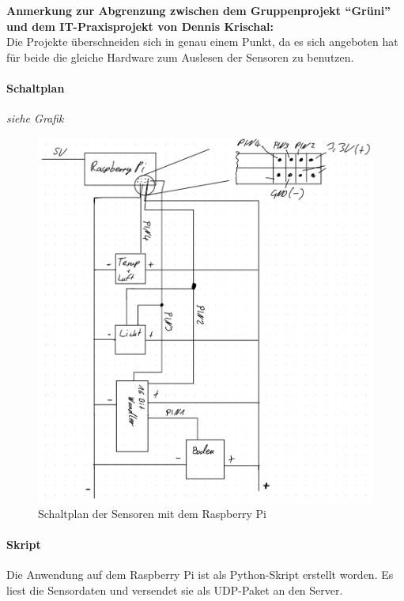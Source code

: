 \textbf{Anmerkung zur Abgrenzung zwischen dem Gruppenprojekt ``Grüni''
und dem IT-Praxisprojekt von Dennis Krischal:}\\
Die Projekte überschneiden sich in genau einem Punkt, da es sich
angeboten hat für beide die gleiche Hardware zum Auslesen der Sensoren
zu benutzen.

\hypertarget{schaltplan}{%
\paragraph{Schaltplan}\label{schaltplan}}

\emph{siehe Grafik}

\begin{figure}
\centering
\includegraphics{img/schaltplan.png}
\caption{Schaltplan der Sensoren mit dem Raspberry Pi}
\end{figure}

\hypertarget{skript}{%
\paragraph{Skript}\label{skript}}

Die Anwendung auf dem Raspberry Pi ist als Python-Skript erstellt
worden. Es liest die Sensordaten und versendet sie als UDP-Paket an den
Server.

